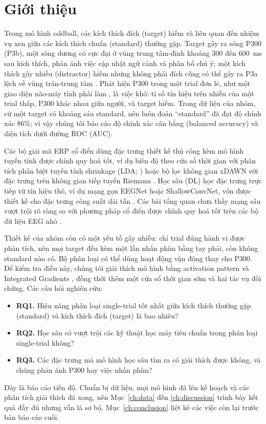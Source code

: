 \section{Giới thiệu}
\label{ch:intro}

Trong mô hình oddball, các kích thích đích (target) hiếm và liên quan đến nhiệm vụ xen giữa các kích thích chuẩn (standard) thường gặp. Target gây ra sóng P300 (P3b), một sóng dương có cực đại ở vùng trung tâm-đỉnh khoảng 300 đến 600~ms sau kích thích, phản ánh việc cập nhật ngữ cảnh và phân bổ chú ý; một kích thích gây nhiễu (distractor) hiếm nhưng không phải đích cũng có thể gây ra P3a lệch về vùng trán-trung tâm \citep{polich2007}. Phát hiện P300 trong một trial đơn lẻ, như một giao diện não-máy tính phải làm \citep{farwell1988}, là việc khó: tỉ số tín hiệu trên nhiễu của một trial thấp, P300 khác nhau giữa người, và target hiếm. Trong dữ liệu của nhóm, cứ một target có khoảng sáu standard, nên luôn đoán ``standard'' đã đạt độ chính xác 86\%; vì vậy chúng tôi báo cáo độ chính xác cân bằng (balanced accuracy) và diện tích dưới đường ROC (AUC).

Các bộ giải mã ERP cổ điển dùng đặc trưng thiết kế thủ công kèm mô hình tuyến tính được chính quy hoá tốt, ví dụ biên độ theo cửa sổ thời gian với phân tích phân biệt tuyến tính shrinkage (LDA; \citealp{blankertz2011}) hoặc bộ lọc không gian xDAWN với đặc trưng trên không gian tiếp tuyến Riemann \citep{rivet2009,barachant2012}. Học sâu (DL) học đặc trưng trực tiếp từ tín hiệu thô, ví dụ mạng gọn EEGNet \citep{lawhern2018} hoặc ShallowConvNet, vốn được thiết kế cho đặc trưng công suất dải tần \citep{schirrmeister2017}. Các bài tổng quan chưa thấy mạng sâu vượt trội rõ ràng so với phương pháp cổ điển được chính quy hoá tốt trên các bộ dữ liệu EEG nhỏ \citep{lotte2018,roy2019}.

Thiết kế của nhóm còn có một yếu tố gây nhiễu: chỉ trial đúng hành vi được phân tích, nên mọi target đều kèm một lần nhấn phím bằng tay phải, còn không standard nào có. Bộ phân loại có thể dùng hoạt động vận động thay cho P300. Để kiểm tra điều này, chúng tôi giải thích mô hình bằng activation pattern \citep{haufe2014} và Integrated Gradients \citep{sundararajan2017}, đồng thời thêm một cửa sổ thời gian sớm và hai tác vụ đối chứng. Các câu hỏi nghiên cứu:
\begin{itemize}
  \item \textbf{RQ1.} Hiệu năng phân loại single-trial tốt nhất giữa kích thích thường gặp (standard) và kích thích đích (target) là bao nhiêu?
  \item \textbf{RQ2.} Học sâu có vượt trội các kỹ thuật học máy tiêu chuẩn trong phân loại single-trial không?
  \item \textbf{RQ3.} Các đặc trưng mà mô hình học sâu tìm ra có giải thích được không, và chúng phản ánh P300 hay việc nhấn phím?
\end{itemize}

Đây là báo cáo tiến độ. Chuẩn bị dữ liệu, mọi mô hình đã lên kế hoạch và các phân tích giải thích đã xong, nên Mục~\ref{ch:data} đến \ref{ch:discussion} trình bày kết quả đầy đủ nhưng vẫn là sơ bộ. Mục~\ref{ch:conclusion} liệt kê các việc còn lại trước bản báo cáo cuối.
